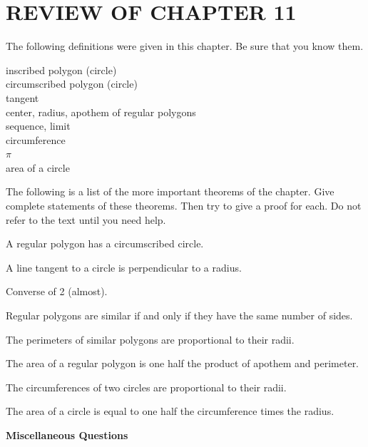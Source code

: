 \documentclass[11pt]{book}
\theoremstyle{bkplain}
\theoremstyle{XIplainnote}
\theoremstyle{bkplain}
\theoremstyle{bkplain}
\begin{document}
\section*{REVIEW OF CHAPTER 11}

The following definitions were given in this chapter. Be sure that you know
them.

\begin{center}
\begin{minipage}{0.66\linewidth}
inscribed polygon (circle)\\
circumscribed polygon (circle)\\
tangent\\
center, radius, apothem of regular polygons\\
sequence, limit\\
circumference\\
$\pi$\\
area of a circle
\end{minipage}
\end{center}

The following is a list of the more important theorems of the chapter. Give
complete statements of these theorems. Then try to give a proof for each. Do
not refer to the text until you need help.

\begin{exlist}
\item A regular polygon has a circumscribed circle.
\item A line tangent to a circle is perpendicular to a radius.
\item Converse of 2 (almost).
\item Regular polygons are similar if and only if they have the same number of
      sides.
\item The perimeters of similar polygons are proportional to their radii.
\item The area of a regular polygon is one half the product of apothem and
      perimeter.
\item The circumferences of two circles are proportional to their radii.
\item The area of a circle is equal to one half the circumference times the
      radius.
\end{exlist}

\begin{center}\bfseries Miscellaneous Questions\end{center}
\nopagebreak
\end{document}
